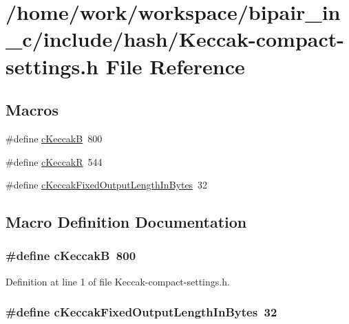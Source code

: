 \hypertarget{Keccak-compact-settings_8h}{\section{/home/work/workspace/bipair\-\_\-in\-\_\-c/include/hash/\-Keccak-\/compact-\/settings.h File Reference}
\label{Keccak-compact-settings_8h}
}
\subsection*{Macros}
\begin{DoxyCompactItemize}
\item 
\#define \hyperlink{Keccak-compact-settings_8h_aadd233299e8a09d586ace2b1e0a35723}{c\-Keccak\-B}~800
\item 
\#define \hyperlink{Keccak-compact-settings_8h_a5fc5899c67f1a4fdaa0a268ffae677bf}{c\-Keccak\-R}~544
\item 
\#define \hyperlink{Keccak-compact-settings_8h_a8707bae80e8f7d66d208a01107024b9e}{c\-Keccak\-Fixed\-Output\-Length\-In\-Bytes}~32
\end{DoxyCompactItemize}


\subsection{Macro Definition Documentation}
\hypertarget{Keccak-compact-settings_8h_aadd233299e8a09d586ace2b1e0a35723}{
\subsubsection[{c\-Keccak\-B}]{\setlength{\rightskip}{0pt plus 5cm}\#define c\-Keccak\-B~800}}\label{Keccak-compact-settings_8h_aadd233299e8a09d586ace2b1e0a35723}


Definition at line 1 of file Keccak-\/compact-\/settings.\-h.

\hypertarget{Keccak-compact-settings_8h_a8707bae80e8f7d66d208a01107024b9e}{
\subsubsection[{c\-Keccak\-Fixed\-Output\-Length\-In\-Bytes}]{\setlength{\rightskip}{0pt plus 5cm}\#define c\-Keccak\-Fixed\-Output\-Length\-In\-Bytes~32}}\label{Keccak-compact-settings_8h_a8707bae80e8f7d66d208a01107024b9e}


